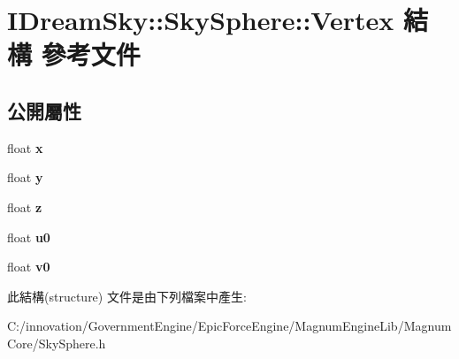 \hypertarget{struct_i_dream_sky_1_1_sky_sphere_1_1_vertex}{}\section{I\+Dream\+Sky\+:\+:Sky\+Sphere\+:\+:Vertex 結構 參考文件}
\label{struct_i_dream_sky_1_1_sky_sphere_1_1_vertex}
\subsection*{公開屬性}
\begin{DoxyCompactItemize}
\item 
float {\bfseries x}\hypertarget{struct_i_dream_sky_1_1_sky_sphere_1_1_vertex_a53172a5ce598938351af298ce6365d2a}{}\label{struct_i_dream_sky_1_1_sky_sphere_1_1_vertex_a53172a5ce598938351af298ce6365d2a}

\item 
float {\bfseries y}\hypertarget{struct_i_dream_sky_1_1_sky_sphere_1_1_vertex_ac3a3cd1ea3492a123899c7de81dc99c6}{}\label{struct_i_dream_sky_1_1_sky_sphere_1_1_vertex_ac3a3cd1ea3492a123899c7de81dc99c6}

\item 
float {\bfseries z}\hypertarget{struct_i_dream_sky_1_1_sky_sphere_1_1_vertex_a87f2739f9a77cd9559474817957b5a89}{}\label{struct_i_dream_sky_1_1_sky_sphere_1_1_vertex_a87f2739f9a77cd9559474817957b5a89}

\item 
float {\bfseries u0}\hypertarget{struct_i_dream_sky_1_1_sky_sphere_1_1_vertex_afee0407d003626573f9a34585a1a643e}{}\label{struct_i_dream_sky_1_1_sky_sphere_1_1_vertex_afee0407d003626573f9a34585a1a643e}

\item 
float {\bfseries v0}\hypertarget{struct_i_dream_sky_1_1_sky_sphere_1_1_vertex_a415e0bd2440bf18e3e19f6a5b124ee81}{}\label{struct_i_dream_sky_1_1_sky_sphere_1_1_vertex_a415e0bd2440bf18e3e19f6a5b124ee81}

\end{DoxyCompactItemize}


此結構(structure) 文件是由下列檔案中產生\+:\begin{DoxyCompactItemize}
\item 
C\+:/innovation/\+Government\+Engine/\+Epic\+Force\+Engine/\+Magnum\+Engine\+Lib/\+Magnum\+Core/Sky\+Sphere.\+h\end{DoxyCompactItemize}
